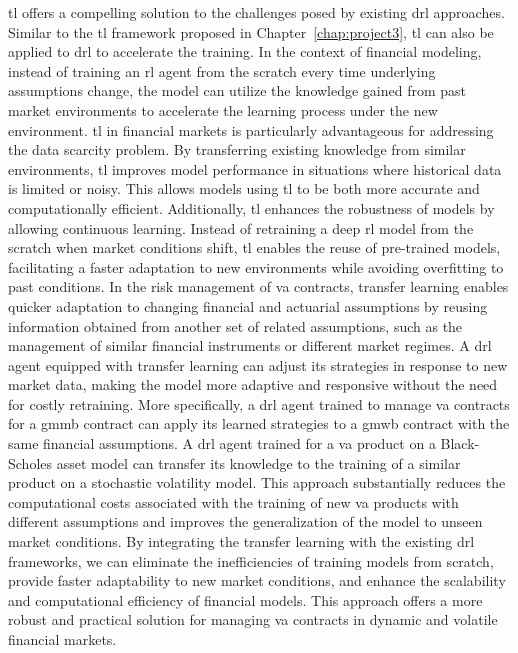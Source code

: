\gls{tl} offers a compelling solution to the challenges posed by existing \gls{drl} approaches. 
Similar to the \gls{tl} framework proposed in Chapter~\ref{chap:project3}, \gls{tl} can also be applied to \gls{drl} to accelerate the training.
In the context of financial modeling, instead of training an \gls{rl} agent from the scratch every time underlying assumptions change, the model can utilize the knowledge gained from past market environments to accelerate the learning process under the new environment.
\gls{tl} in financial markets is particularly advantageous for addressing the data scarcity problem. 
By transferring existing knowledge from similar environments, \gls{tl} improves model performance in situations where historical data is limited or noisy. 
This allows models using \gls{tl} to be both more accurate and computationally efficient. 
Additionally, \gls{tl} enhances the robustness of models by allowing continuous learning. 
Instead of retraining a deep \gls{rl} model from the scratch when market conditions shift, \gls{tl} enables the reuse of pre-trained models, facilitating a faster adaptation to new environments while avoiding overfitting to past conditions.
In the risk management of \gls{va} contracts, transfer learning enables quicker adaptation to changing financial and actuarial assumptions by reusing information obtained from another set of related assumptions, such as the management of similar financial instruments or different market regimes. 
A \gls{drl} agent equipped with transfer learning can adjust its strategies in response to new market data, making the model more adaptive and responsive without the need for costly retraining.
More specifically, a \gls{drl} agent trained to manage \gls{va} contracts for a \gls{gmmb} contract can apply its learned strategies to a \gls{gmwb} contract with the same financial assumptions. 
A \gls{drl} agent trained for a \gls{va} product on a Black-Scholes asset model can transfer its knowledge to the training of a similar product on a stochastic volatility model.
This approach substantially reduces the computational costs associated with the training of new \gls{va} products with different assumptions and improves the generalization of the model to unseen market conditions.
By integrating the transfer learning with the existing \gls{drl} frameworks, we can eliminate the inefficiencies of training models from scratch, provide faster adaptability to new market conditions, and enhance the scalability and computational efficiency of financial models. 
This approach offers a more robust and practical solution for managing \gls{va} contracts in dynamic and volatile financial markets.

